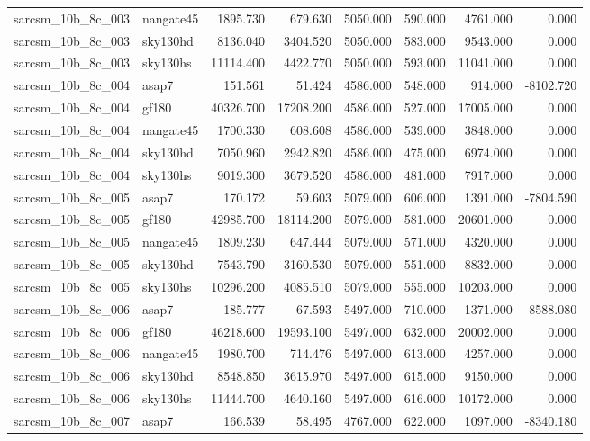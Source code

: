 \begin{tabular}{llrrrrrr}
sarcsm\_10b\_8c\_003 & nangate45 & 1895.730 & 679.630 & 5050.000 & 590.000 & 4761.000 & 0.000 \\
sarcsm\_10b\_8c\_003 & sky130hd & 8136.040 & 3404.520 & 5050.000 & 583.000 & 9543.000 & 0.000 \\
sarcsm\_10b\_8c\_003 & sky130hs & 11114.400 & 4422.770 & 5050.000 & 593.000 & 11041.000 & 0.000 \\
sarcsm\_10b\_8c\_004 & asap7 & 151.561 & 51.424 & 4586.000 & 548.000 & 914.000 & -8102.720 \\
sarcsm\_10b\_8c\_004 & gf180 & 40326.700 & 17208.200 & 4586.000 & 527.000 & 17005.000 & 0.000 \\
sarcsm\_10b\_8c\_004 & nangate45 & 1700.330 & 608.608 & 4586.000 & 539.000 & 3848.000 & 0.000 \\
sarcsm\_10b\_8c\_004 & sky130hd & 7050.960 & 2942.820 & 4586.000 & 475.000 & 6974.000 & 0.000 \\
sarcsm\_10b\_8c\_004 & sky130hs & 9019.300 & 3679.520 & 4586.000 & 481.000 & 7917.000 & 0.000 \\
sarcsm\_10b\_8c\_005 & asap7 & 170.172 & 59.603 & 5079.000 & 606.000 & 1391.000 & -7804.590 \\
sarcsm\_10b\_8c\_005 & gf180 & 42985.700 & 18114.200 & 5079.000 & 581.000 & 20601.000 & 0.000 \\
sarcsm\_10b\_8c\_005 & nangate45 & 1809.230 & 647.444 & 5079.000 & 571.000 & 4320.000 & 0.000 \\
sarcsm\_10b\_8c\_005 & sky130hd & 7543.790 & 3160.530 & 5079.000 & 551.000 & 8832.000 & 0.000 \\
sarcsm\_10b\_8c\_005 & sky130hs & 10296.200 & 4085.510 & 5079.000 & 555.000 & 10203.000 & 0.000 \\
sarcsm\_10b\_8c\_006 & asap7 & 185.777 & 67.593 & 5497.000 & 710.000 & 1371.000 & -8588.080 \\
sarcsm\_10b\_8c\_006 & gf180 & 46218.600 & 19593.100 & 5497.000 & 632.000 & 20002.000 & 0.000 \\
sarcsm\_10b\_8c\_006 & nangate45 & 1980.700 & 714.476 & 5497.000 & 613.000 & 4257.000 & 0.000 \\
sarcsm\_10b\_8c\_006 & sky130hd & 8548.850 & 3615.970 & 5497.000 & 615.000 & 9150.000 & 0.000 \\
sarcsm\_10b\_8c\_006 & sky130hs & 11444.700 & 4640.160 & 5497.000 & 616.000 & 10172.000 & 0.000 \\
sarcsm\_10b\_8c\_007 & asap7 & 166.539 & 58.495 & 4767.000 & 622.000 & 1097.000 & -8340.180 \\

\end{tabular}

